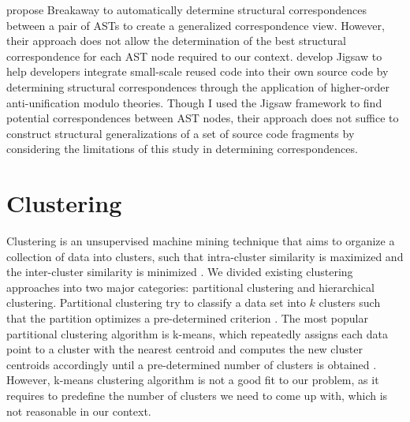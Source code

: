 \citet{2007:esec_fse:cottrell} propose Breakaway to automatically determine structural correspondences between a pair of ASTs to create a generalized correspondence view. However, their approach does not allow the determination of the best structural correspondence for each AST node required to our context. \citet{2008:fse:cottrell} develop Jigsaw to help developers integrate small-scale reused code into their own source code by determining structural correspondences through the application of higher-order anti-unification modulo theories. Though I used the Jigsaw framework to find potential correspondences between AST nodes, their approach does not suffice to construct structural generalizations of a set of source code fragments by considering the limitations of this study in determining correspondences.


\section{Clustering}  \label{ch7-clustering}

Clustering is an unsupervised machine mining technique that aims to organize a collection of data into clusters, such that intra-cluster similarity is maximized and the inter-cluster similarity is minimized \cite{karypis1999chameleon,grira2004unsupervised}. We divided existing clustering approaches into two major categories: partitional clustering and hierarchical clustering. Partitional clustering try to classify a data set into $k$ clusters such that the partition optimizes a pre-determined criterion \cite{karypis1999chameleon}. The most popular partitional clustering algorithm is k-means, which repeatedly assigns each data point to a cluster with the nearest centroid and computes the new cluster centroids accordingly until a pre-determined number of clusters is obtained \cite{bouguettaya2015efficient}. However, k-means clustering algorithm is not a good fit to our problem, as it requires to predefine the number of clusters we need to come up with, which is not reasonable in our context. %

